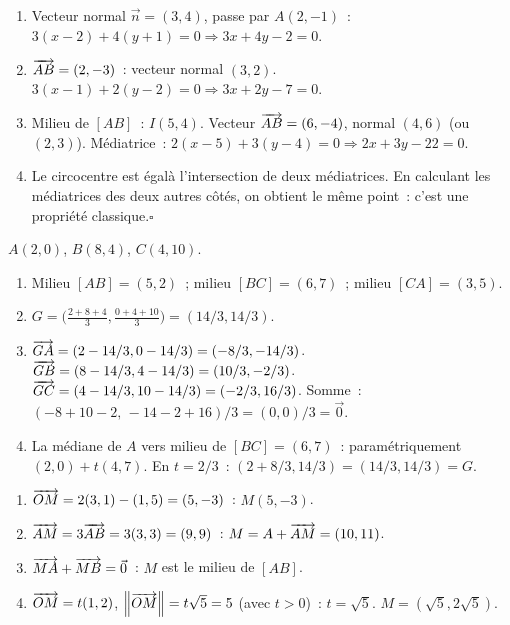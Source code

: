 \begin{enumerate}
  \item Vecteur normal $\vec{n}=(3,4)$, passe par $A(2,-1)$~:
        $3(x-2)+4(y+1)=0\Rightarrow3x+4y-2=0$.
  \item $\overrightarrow{AB}=(2,-3)$~: vecteur normal $(3,2)$.
        $3(x-1)+2(y-2)=0\Rightarrow3x+2y-7=0$.
  \item Milieu de $[AB]$~: $I(5,4)$. Vecteur $\overrightarrow{AB}=(6,-4)$, normal $(4,6)$ (ou $(2,3)$).
        M\'ediatrice~: $2(x-5)+3(y-4)=0\Rightarrow2x+3y-22=0$.
  \item Le circocentre est \'egal\`a l'intersection de deux m\'ediatrices.
        En calculant les m\'ediatrices des deux autres c\^ot\'es, on obtient le m\^eme point~:
        c'est une propri\'et\'e classique.\hfill$\square$
\end{enumerate}


$A(2,0)$, $B(8,4)$, $C(4,10)$.
\begin{enumerate}
  \item Milieu $[AB]=(5,2)$~; milieu $[BC]=(6,7)$~; milieu $[CA]=(3,5)$.
  \item $G=\bigl(\tfrac{2+8+4}{3},\tfrac{0+4+10}{3}\bigr)=(14/3,14/3)$.
  \item $\overrightarrow{GA}=(2-14/3,0-14/3)=(-8/3,-14/3)$.
        $\overrightarrow{GB}=(8-14/3,4-14/3)=(10/3,-2/3)$.
        $\overrightarrow{GC}=(4-14/3,10-14/3)=(-2/3,16/3)$.
        Somme~: $(-8+10-2,\,-14-2+16)/3=(0,0)/3=\vec{0}$.\checkmark
  \item La m\'ediane de $A$ vers milieu de $[BC]=(6,7)$~:
        param\'etriquement $(2,0)+t(4,7)$. En $t=2/3$~: $(2+8/3,14/3)=(14/3,14/3)=G$.\checkmark
\end{enumerate}


\begin{enumerate}
  \item $\overrightarrow{OM}=2(3,1)-(1,5)=(5,-3)$~: $M(5,-3)$.
  \item $\overrightarrow{AM}=3\overrightarrow{AB}=3(3,3)=(9,9)$~: $M=A+\overrightarrow{AM}=(10,11)$.
  \item $\overrightarrow{MA}+\overrightarrow{MB}=\vec{0}$~: $M$ est le milieu de $[AB]$.
  \item $\overrightarrow{OM}=t(1,2)$, $\left\|\overrightarrow{OM}\right\|=t\sqrt{5}=5$ (avec $t>0$)~: $t=\sqrt{5}$.
        $M=(\sqrt{5},2\sqrt{5})$.
\end{enumerate}

